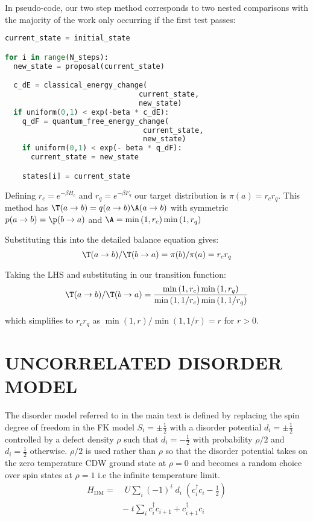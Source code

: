 In pseudo-code, our two step method corresponds to two nested comparisons with the majority of the work only occurring if the first test passes:

\begin{lstlisting}[language=Python]
current_state = initial_state

for i in range(N_steps):
  new_state = proposal(current_state)

  c_dE = classical_energy_change(
                               current_state,
                               new_state)
  if uniform(0,1) < exp(-beta * c_dE):
    q_dF = quantum_free_energy_change(
                                current_state,
                                new_state)
    if uniform(0,1) < exp(- beta * q_dF):
      current_state = new_state

    states[i] = current_state
\end{lstlisting}

Defining \(r_c = e^{-\beta H_c}\) and \(r_q = e^{-\beta F_q}\) our target distribution is \(\pi(a) = r_c r_q\). This method has \(\T(a\to b) = q(a\to b)\A(a \to b)\) with symmetric \(p(a \to b) = \p(b \to a)\) and \(\A = \min\left(1, r_c\right) \min\left(1, r_q\right)\) 

 Substituting this into the detailed balance equation gives: 
\[\T(a \to b)/\T(b \to a) = \pi(b)/\pi(a) = r_c r_q\]

Taking the LHS and substituting in our transition function:
\begin{align}
\T(a \to b)/\T(b \to a) = \frac{\min\left(1, r_c\right) \min\left(1, r_q\right)}{ \min\left(1, 1/r_c\right) \min\left(1, 1/r_q\right)}
\end{align}

which simplifies to \(r_c r_q\) as \(\min(1,r)/\min(1,1/r) = r\) for \(r > 0\). 

\section{\label{app:disorder_model}
UNCORRELATED DISORDER MODEL
}

The disorder model referred to in the main text is defined by replacing the spin degree of freedom in the FK model \(S_i = \pm \tfrac{1}{2}\) with a disorder potential \(d_i = \pm \tfrac{1}{2}\) controlled by a defect density \(\rho\) such that \(d_i = -\tfrac{1}{2}\) with probability \(\rho/2\) and \(d_i = \tfrac{1}{2}\) otherwise. \(\rho/2\) is used rather than \(\rho\) so that the disorder potential takes on the zero temperature CDW ground state at \(\rho = 0\) and becomes a random choice over spin states at \(\rho = 1\) i.e the infinite temperature limit.
~
\begin{align}
H_{\mathrm{DM}} = & \;U \sum_{i} (-1)^i \; d_i \;(c^\dag_{i}c_{i} - \tfrac{1}{2}) \\
& -\;t \sum_{i} c^\dag_{i}c_{i+1} + c^\dag_{i+1}c_{i} \nonumber
\end{align}
